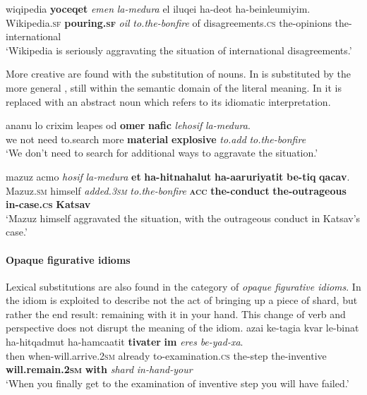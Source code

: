 \documentclass[output=paper]{langsci/langscibook}
\begin{document}
    \ea\label{she:medura-sub-verb}
        \gll wiqipedia \textbf{yoceqet} \textit{{\shin}emen} \textit{la-medura} {\shin}el {\het}iluqei ha-de{\ayin}ot ha-beinle{\alef}umiyim.\\
            Wikipedia.\textsc{sf} \textbf{pouring.\textsc{sf}} \textit{oil} \textit{to.the-bonfire} of disagreements.\textsc{cs} the-opinions the-international\\
        \glt `Wikipedia is seriously aggravating the situation of international disagreements.'
    \z

More creative  are found with the substitution of nouns. In   is substituted by the more general , still within the semantic domain of the literal meaning. In  it is replaced with an abstract noun which refers to its idiomatic interpretation.

     \ea\label{she:medura-sub-do-lit}
        \gll {\alef}ana{\het}nu lo crixim le{\het}apes {\ayin}od \textbf{{\hetB}omer} \textbf{nafic} \textit{lehosif} \textit{la-medura}.\\
            we not need to.search more \textbf{material} \textbf{explosive} \textit{to.add} \textit{to.the-bonfire}\\
        \glt `We don't need to search for additional ways to aggravate the situation.'
    \z

	\ea\label{she:medura-sub-do-id}
    	\gll mazuz {\ayin}acmo \textit{hosif} \textit{la-medura} \textbf{{\alefB}et} \textbf{ha-hitnahalut} \textbf{ha-{\shinB}a{\ayinB}aruriyatit} \textbf{be-tiq} \textbf{qacav}.\\
    	   Mazuz.\textsc{sm} himself \textit{added.\textsc{3sm}} \textit{to.the-bonfire} \textbf{\textsc{acc}} \textbf{the-conduct} \textbf{the-outrageous} \textbf{in-case.\textsc{cs}} \textbf{Katsav}\\
    	\glt `Mazuz himself aggravated the situation, with the outrageous conduct in Katsav's case.'
	\z

 \paragraph*{Opaque figurative idioms}

Lexical substitutions are also found in the category of \textit{opaque figurative idioms}.
In  the idiom is exploited to describe not the act of bringing up a piece of shard, but rather the end result: remaining with it in your hand. This change of verb and perspective does not disrupt the meaning of the idiom.
    \ea\label{she:xeres-sub}
        \gll {\alef}azai k{\shin}e-tagi{\ayin}a kvar le-b{\het}inat ha-hitqadmut ha-hamca{\alef}atit \textbf{tivater} \textbf{{\ayinB}im} \textit{{\het}eres} \textit{be-yad-xa}.\\
            then when-will.arrive.\textsc{2sm} already to-examination.\textsc{cs} the-step the-inventive \textbf{will.remain.\textsc{2sm}} \textbf{with} \textit{shard} \textit{in-hand-your}\\
        \glt `When you finally get to the examination of inventive step you will have failed.'
    \z
\end{document}
